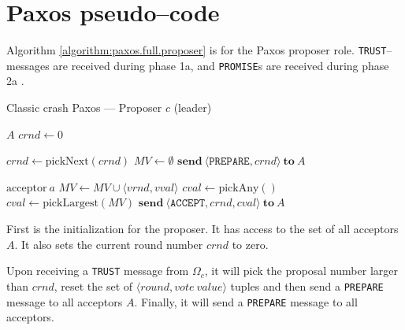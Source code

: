\section{Paxos pseudo--code}

Algorithm \ref{algorithm:paxos.full.proposer} is for the Paxos proposer
role.  \texttt{TRUST}--messages are received during phase 1a, and
\texttt{PROMISE}s are received during phase 2a \cite{Lam01}.

\begin{algorithm}
  \caption{Classic crash Paxos --- Proposer $c$ (leader)}
  \label{algorithm:paxos.full.proposer}
  \begin{algorithmic}

    \State $A$
    \State $crnd \gets 0$
    \State

      \State $crnd \gets \text{pickNext}(crnd)$
      \State $MV \gets \emptyset$
      \State $\textbf{send}\ \langle \texttt{PREPARE}, crnd \rangle\ \textbf{to}\ A$
    \EndOn
    \State

       {$\text{acceptor}\ a$}
       \State $MV \gets MV \cup \langle vrnd, vval \rangle$
       \State
           \State $cval \gets \text{pickAny}()$
         \Else
           \State $cval \gets \text{pickLargest}(MV)$
         \EndIf
        \State $\textbf{send}\ \langle \texttt{ACCEPT}, crnd, cval \rangle\ \textbf{to}\ A$
       \EndIf
    \EndOn

  \end{algorithmic}
\end{algorithm}

First is the initialization for the proposer. It has access to the set of
all acceptors $A$.  It also sets the current round number $crnd$ to
zero.

Upon receiving a \texttt{TRUST} message from $\Omega_c$, it will
pick the proposal number larger than $crnd$, reset the set of $\langle round, vote~value\rangle$ tuples and then send a \texttt{PREPARE} message to all
acceptors $A$.  Finally, it will send a \texttt{PREPARE} message to all
acceptors.

